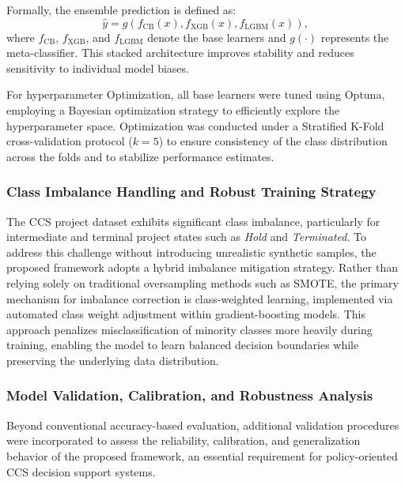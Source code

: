 \documentclass[conference]{IEEEtran}
\begin{document}
Formally, the ensemble prediction is defined as:
\begin{equation}
\hat{y} = g\left( f_{\mathrm{CB}}(x), f_{\mathrm{XGB}}(x), f_{\mathrm{LGBM}}(x) \right),
\end{equation}
where $f_{\mathrm{CB}}$, $f_{\mathrm{XGB}}$, and $f_{\mathrm{LGBM}}$ denote the base learners and $g(\cdot)$ represents the meta-classifier. This stacked architecture improves stability and reduces sensitivity to individual model biases.

For hyperparameter Optimization, all base learners were tuned using Optuna, employing a Bayesian optimization strategy to efficiently explore the hyperparameter space. Optimization was conducted under a Stratified K-Fold cross-validation protocol ($k = 5$) to ensure consistency of the class distribution across the folds and to stabilize performance estimates.


\subsubsection{\textbf{Class Imbalance Handling and Robust Training Strategy}}

The CCS project dataset exhibits significant class imbalance, particularly for intermediate and terminal project states such as \textit{Hold} and \textit{Terminated}. To address this challenge without introducing unrealistic synthetic samples, the proposed framework adopts a hybrid imbalance mitigation strategy. Rather than relying solely on traditional oversampling methods such as SMOTE, the primary mechanism for imbalance correction is class-weighted learning, implemented via automated class weight adjustment within gradient-boosting models. This approach penalizes misclassification of minority classes more heavily during training, enabling the model to learn balanced decision boundaries while preserving the underlying data distribution.

\subsubsection{\textbf{Model Validation, Calibration, and Robustness Analysis}}

Beyond conventional accuracy-based evaluation, additional validation procedures were incorporated to assess the reliability, calibration, and generalization behavior of the proposed framework, an essential requirement for policy-oriented CCS decision support systems.
\end{document}
